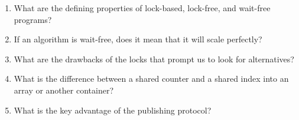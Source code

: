 \begin{enumerate}
\item 
What are the defining properties of lock-based, lock-free, and wait-free programs?

\item 
If an algorithm is wait-free, does it mean that it will scale perfectly?

\item 
What are the drawbacks of the locks that prompt us to look for alternatives?

\item
What is the difference between a shared counter and a shared index into an array or another container?

\item
What is the key advantage of the publishing protocol?
\end{enumerate}